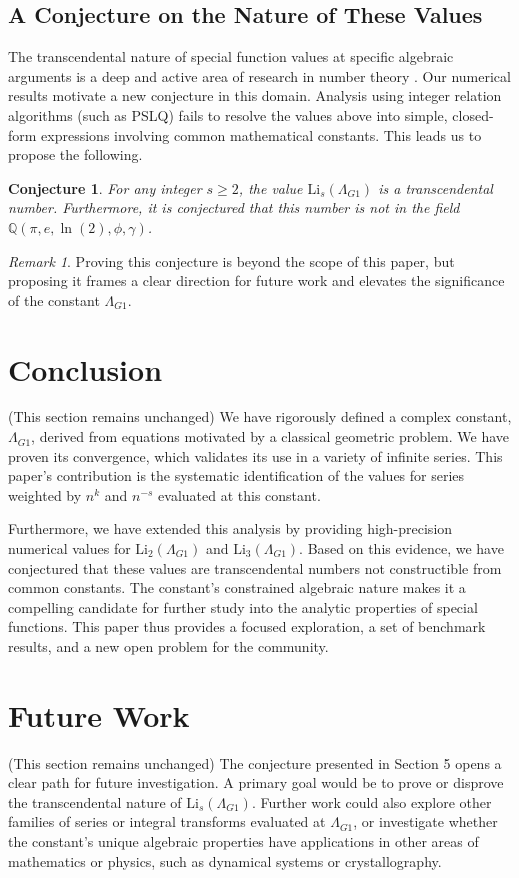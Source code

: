 \documentclass{amsart}
\theoremstyle{plain}
\newtheorem{conjecture}[theorem]{Conjecture}
\theoremstyle{definition}
\theoremstyle{remark}
\newtheorem*{remark}{Remark}
\newcommand{\LambdaG}{\Lambda_{G1}}
\begin{document}
\subsection{A Conjecture on the Nature of These Values}
The transcendental nature of special function values at specific algebraic arguments is a deep and active area of research in number theory \cite{Lewin}. Our numerical results motivate a new conjecture in this domain. Analysis using integer relation algorithms (such as PSLQ) fails to resolve the values above into simple, closed-form expressions involving common mathematical constants. This leads us to propose the following.

\begin{conjecture}
For any integer $s \ge 2$, the value $\mathrm{Li}_s(\LambdaG)$ is a transcendental number. Furthermore, it is conjectured that this number is not in the field $\mathbb{Q}(\pi, e, \ln(2), \phi, \gamma)$.
\end{conjecture}
\begin{remark}
Proving this conjecture is beyond the scope of this paper, but proposing it frames a clear direction for future work and elevates the significance of the constant $\LambdaG$.
\end{remark}

\section{Conclusion}
(This section remains unchanged)
We have rigorously defined a complex constant, $\LambdaG$, derived from equations motivated by a classical geometric problem. We have proven its convergence, which validates its use in a variety of infinite series. This paper's contribution is the systematic identification of the values for series weighted by $n^k$ and $n^{-s}$ evaluated at this constant.

Furthermore, we have extended this analysis by providing high-precision numerical values for $\mathrm{Li}_2(\LambdaG)$ and $\mathrm{Li}_3(\LambdaG)$. Based on this evidence, we have conjectured that these values are transcendental numbers not constructible from common constants. The constant's constrained algebraic nature makes it a compelling candidate for further study into the analytic properties of special functions. This paper thus provides a focused exploration, a set of benchmark results, and a new open problem for the community.

\section{Future Work}
(This section remains unchanged)
The conjecture presented in Section 5 opens a clear path for future investigation. A primary goal would be to prove or disprove the transcendental nature of $\mathrm{Li}_s(\LambdaG)$. Further work could also explore other families of series or integral transforms evaluated at $\LambdaG$, or investigate whether the constant's unique algebraic properties have applications in other areas of mathematics or physics, such as dynamical systems or crystallography.
\end{document}

